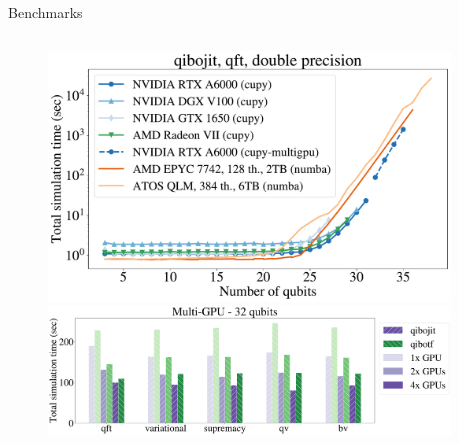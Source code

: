 \documentclass[11pt]{beamer}
\begin{document}
\begin{frame}{Benchmarks}
    \begin{columns}
        \begin{column}{0.8 \textwidth}

            \begin{figure}
            \includegraphics[width=0.8 \textwidth]{figures/devices_qft_total_simulation_time_double.pdf}
            \hspace{0.5cm}

            \includegraphics[width=0.8 \textwidth]{figures/multigpu_32qubits_total_simulation_time_double.pdf}
            \end{figure}
        \end{column}
        \hspace{-1cm}
        \begin{column}{0.4 \textwidth}
            \vspace{-1cm}


\end{column}
\end{columns}
\end{frame}
\end{document}
